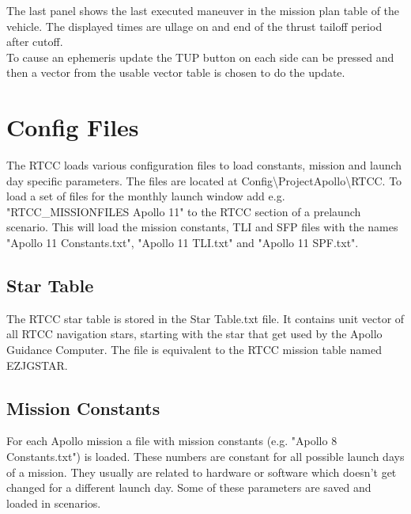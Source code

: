 \documentclass[11pt]{article} %
\begin{document}
The last panel shows the last executed maneuver in the mission plan table of the vehicle. The displayed times are ullage on and end of the thrust tailoff period after cutoff.\\

To cause an ephemeris update the TUP button on each side can be pressed and then a vector from the usable vector table is chosen to do the update.\\

\newpage
\section{Config Files}

The RTCC loads various configuration files to load constants, mission and launch day specific parameters. The files are located at Config\textbackslash ProjectApollo\textbackslash RTCC. To load a set of files for the monthly launch window add e.g. "RTCC\_MISSIONFILES Apollo 11" to the RTCC section of a prelaunch scenario. This will load the mission constants, TLI and SFP files with the names "Apollo 11 Constants.txt", "Apollo 11 TLI.txt" and "Apollo 11 SPF.txt".\\

\subsection{Star Table}

The RTCC star table is stored in the Star Table.txt file. It contains unit vector of all RTCC navigation stars, starting with the star that get used by the Apollo Guidance Computer. The file is equivalent to the RTCC mission table named EZJGSTAR.

\subsection{Mission Constants}

For each Apollo mission a file with mission constants (e.g. "Apollo 8 Constants.txt") is loaded. These numbers are constant for all possible launch days of a mission. They usually are related to hardware or software which doesn't get changed for a different launch day. Some of these parameters are saved and loaded in scenarios.\\
\end{document}
